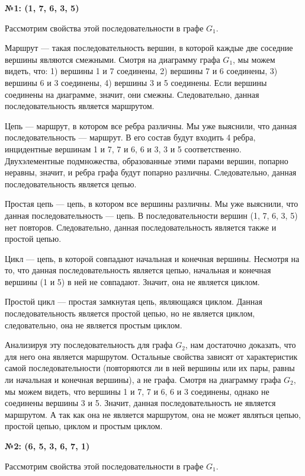 \documentclass[12pt]{article}
\begin{document}
	{\bf №1: (1, 7, 6, 3, 5)}
	
	Рассмотрим свойства этой последовательности в графе $G_1$.
		
	Маршрут --- такая последовательность вершин, в которой каждые две соседние вершины являются смежными. Смотря на диаграмму графа $G_1$, мы можем видеть, что: 1) вершины 1 и 7 соединены, 2) вершины 7 и 6 соединены, 3) вершины 6 и 3 соединены, 4) вершины 3 и 5 соединены. Если вершины соединены на диаграмме, значит, они смежны. Следовательно, данная последовательность является маршрутом.
	
	Цепь --- маршрут, в котором все ребра различны. Мы уже выяснили, что данная последовательность --- маршрут. В его состав будут входить 4 ребра, инцидентные вершинам 1 и 7, 7 и 6, 6 и 3, 3 и 5 соответственно. Двухэлементные подмножества, образованные этими парами вершин, попарно неравны, значит, и ребра графа будут попарно различны. Следовательно, данная последовательность является цепью.
		
	Простая цепь --- цепь, в котором все вершины различны. Мы уже выяснили, что данная последовательность --- цепь. В последовательности вершин (1, 7, 6, 3, 5) нет повторов. Следовательно, данная последовательность является также и простой цепью.
	
	Цикл --- цепь, в которой совпадают начальная и конечная вершины. Несмотря на то, что данная последовательность является цепью, начальная и конечная вершины (1 и 5) в ней не совпадают. Значит, она не является циклом.
	
	Простой цикл --- простая замкнутая цепь, являющаяся циклом. Данная последовательность является простой цепью, но не является циклом, следовательно, она не является простым циклом.
	
	Анализируя эту последовательность для графа $G_2$, нам достаточно доказать, что для него она является маршрутом. Остальные свойства зависят от характеристик самой последовательности (повторяются ли в ней вершины или их пары, равны ли начальная и конечная вершины), а не графа. Смотря на диаграмму графа $G_2$, мы можем видеть, что вершины 1 и 7, 7 и 6, 6 и 3 соединены, однако не соединены вершины 3 и 5. Значит, данная последовательность не является маршрутом. А так как она не является маршрутом, она не может являться цепью, простой цепью, циклом и простым циклом.
	
	{\bf №2: (6, 5, 3, 6, 7, 1)}
	
	Рассмотрим свойства этой последовательности в графе $G_1$.
	
\end{document}
